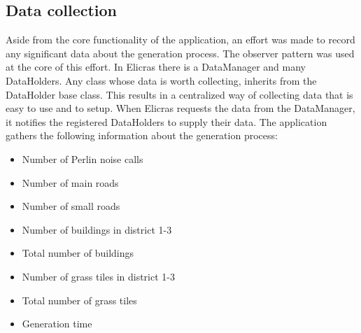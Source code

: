 	\subsection{Data collection}
	Aside from the core functionality of the application, an effort was made to record any significant data about the generation process. The observer pattern was used at the core of this effort. In Elicras there is a DataManager and many DataHolders. Any class whose data is worth collecting, inherits from the DataHolder base class. This results in a centralized way of collecting data that is easy to use and to setup. When Elicras requests the data from the DataManager, it notifies the registered DataHolders to supply their data. The application gathers the following information about the generation process:
		\begin{itemize}
			\item Number of Perlin noise calls
			\item Number of main roads
			\item Number of small roads
			\item Number of buildings in district 1-3
			\item Total number of buildings
			\item Number of grass tiles in district 1-3
			\item Total number of grass tiles
			\item Generation time
		\end{itemize}